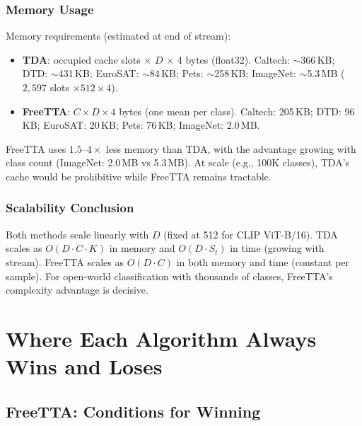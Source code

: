 \documentclass[12pt,a4paper]{article}
\newcommand{\1}{\mathbf{1}}
\begin{document}
\subsubsection{Memory Usage}

Memory requirements (estimated at end of stream):
\begin{itemize}
  \item \textbf{TDA}: occupied cache slots $\times$ $D$ $\times$ 4 bytes (float32).
  Caltech: $\sim$366\,KB; DTD: $\sim$431\,KB; EuroSAT: $\sim$84\,KB; Pets: $\sim$258\,KB;
  ImageNet: $\sim$5.3\,MB ($2{,}597$ slots $\times 512 \times 4$).

  \item \textbf{FreeTTA}: $C \times D \times 4$ bytes (one mean per class).
  Caltech: 205\,KB; DTD: 96\,KB; EuroSAT: 20\,KB; Pets: 76\,KB; ImageNet: 2.0\,MB.
\end{itemize}

FreeTTA uses $1.5$--$4\times$ less memory than TDA, with the advantage growing with class count
(ImageNet: 2.0\,MB vs 5.3\,MB).
At scale (e.g., 100K classes), TDA's cache would be prohibitive while FreeTTA remains tractable.

\subsubsection{Scalability Conclusion}

Both methods scale linearly with $D$ (fixed at 512 for CLIP ViT-B/16).
TDA scales as $O(D \cdot C \cdot K)$ in memory and $O(D \cdot S_t)$ in time (growing with stream).
FreeTTA scales as $O(D \cdot C)$ in both memory and time (constant per sample).
For open-world classification with thousands of classes, FreeTTA's complexity advantage is decisive.

\section{Where Each Algorithm Always Wins and Loses}

\subsection{FreeTTA: Conditions for Winning}
\end{document}
